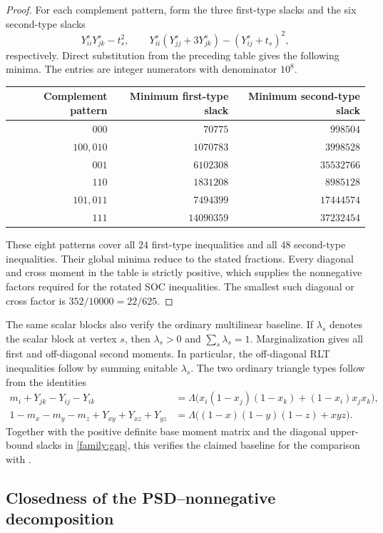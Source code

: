 \begin{proof}
For each complement pattern, form the three first-type slacks and the
six second-type slacks
\[
Y^s_{ii}Y^s_{jk}-t_s^2,\qquad
Y^s_{ii}(Y^s_{jj}+3Y^s_{jk})-(Y^s_{ij}+t_s)^2,
\]
respectively. Direct substitution from the preceding table gives the
following minima. The entries are integer numerators with denominator
$10^8$.
\begin{center}
\begin{tabular}{rrr}
\toprule
Complement pattern & Minimum first-type slack & Minimum second-type slack\\
\midrule
$000$ & $70775$ & $998504$\\
$100,010$ & $1070783$ & $3998528$\\
$001$ & $6102308$ & $35532766$\\
$110$ & $1831208$ & $8985128$\\
$101,011$ & $7494399$ & $17444574$\\
$111$ & $14090359$ & $37232454$\\
\bottomrule
\end{tabular}
\end{center}
These eight patterns cover all $24$ first-type inequalities and all $48$
second-type inequalities. Their global minima reduce to the stated
fractions. Every diagonal and cross moment in the table is strictly
positive, which supplies the nonnegative factors required for the rotated
SOC inequalities. The smallest such diagonal or cross factor is
$352/10000=22/625$.
\end{proof}

The same scalar blocks also verify the ordinary multilinear baseline.
If $\lambda_s$ denotes the scalar block at vertex $s$, then
$\lambda_s>0$ and $\sum_s\lambda_s=1$. Marginalization gives all first
and off-diagonal second moments. In particular, the off-diagonal RLT
inequalities follow by summing suitable $\lambda_s$. The two ordinary
triangle types follow from the identities
\begin{align*}
m_i+Y_{jk}-Y_{ij}-Y_{ik}
&=\Lambda\bigl(x_i(1-x_j)(1-x_k)+(1-x_i)x_jx_k\bigr),\\
1-m_x-m_y-m_z+Y_{xy}+Y_{xz}+Y_{yz}
&=\Lambda\bigl((1-x)(1-y)(1-z)+xyz\bigr).
\end{align*}
Together with the positive definite base moment matrix and the diagonal
upper-bound slacks in \cref{family:gap}, this verifies the claimed
baseline for the comparison with \citet{AnstreicherPuges2025ETRI}.

\subsection{Closedness of the PSD--nonnegative decomposition}

